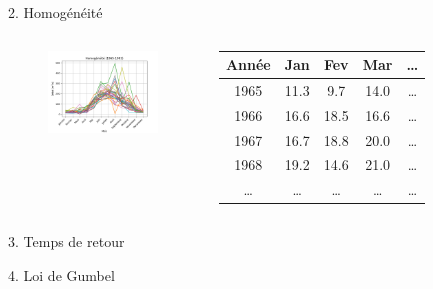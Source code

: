 \documentclass{beamer}
\begin{document}
\begin{frame}{2. Homogénéité}
    \begin{columns}
        \begin{figure}
            \centering
            \includegraphics[width=5cm]{homogeneite.png}
        \end{figure}
        \begin{tabular}{c|c|c|c|c}
            \toprule
            \textbf{Année} & \textbf{Jan} & \textbf{Fev} & \textbf{Mar} & \textbf{\dots} \\
            \midrule
            1965  & 11.3  &  9.7  & 14.0  & \dots \\
            1966  & 16.6  & 18.5  & 16.6  & \dots \\ 
            1967  & 16.7  & 18.8  & 20.0  & \dots \\
            1968  & 19.2  & 14.6  & 21.0  & \dots \\
            \dots & \dots & \dots & \dots & \dots \\
            \bottomrule
        \end{tabular}        
    \end{columns}
\end{frame}

\begin{frame}{3. Temps de retour}
\end{frame}

\begin{frame}{4. Loi de Gumbel}
\end{frame}
\end{document}
